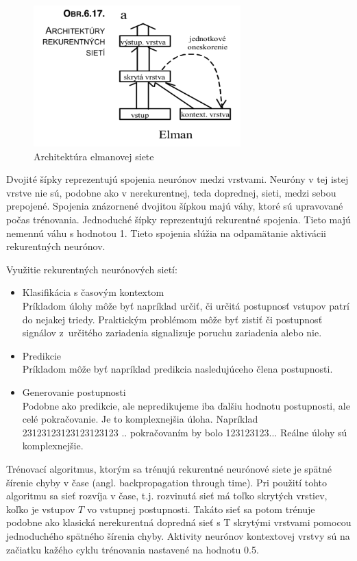 \begin{figure}[H]
	\centering
	\includegraphics[width=8cm]{assets/elman_architecture}
	\caption{Architektúra elmanovej siete}
\end{figure}

Dvojité šípky reprezentujú spojenia neurónov medzi vrstvami. Neuróny v tej istej vrstve nie sú, podobne ako
v nerekurentnej, teda doprednej, sieti, medzi sebou prepojené. Spojenia znázornené dvojitou šípkou majú váhy, ktoré 
sú upravované počas trénovania.
Jednoduché šípky reprezentujú rekurentné spojenia. Tieto majú nemennú váhu s hodnotou 1.
Tieto spojenia slúžia na odpamätanie aktivácii rekurentných neurónov. 

Využitie rekurentných neurónových sietí:\\
\begin{itemize}
	\item Klasifikácia s časovým kontextom \\
	Príkladom úlohy môže byť napríklad určiť, či určitá postupnosť vstupov patrí do nejakej triedy.
	Praktickým problémom môže byť zistiť či postupnosť signálov z~určitého zariadenia signalizuje poruchu zariadenia alebo nie.
	\item Predikcie\\
	Príkladom môže byť napríklad predikcia nasledujúceho člena postupnosti.
	\item Generovanie postupnosti\\
	Podobne ako predikcie, ale nepredikujeme iba ďalšiu hodnotu postupnosti, ale celé pokračovanie.
	Je to komplexnejšia úloha. Napríklad 23123123123123123123 .. pokračovaním by bolo 123123123...
	Reálne úlohy sú komplexnejšie.
\end{itemize}

Trénovací algoritmus, ktorým sa trénujú rekurentné neurónové siete
je spätné šírenie chyby v čase (angl. backpropagation through time).
Pri použití tohto algoritmu sa sieť rozvíja v čase, t.j. rozvinutá sieť má
toľko skrytých vrstiev, koľko je vstupov $T$ vo vstupnej postupnosti. 
Takáto sieť sa potom trénuje podobne ako klasická nerekurentná dopredná sieť s T skrytými vrstvami pomocou jednoduchého spätného šírenia chyby.
Aktivity neurónov kontextovej vrstvy sú na začiatku kažého cyklu trénovania nastavené
na hodnotu 0.5.


